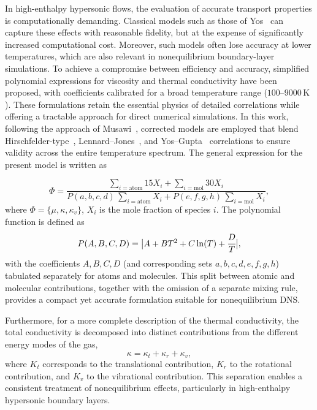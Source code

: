 In high-enthalpy hypersonic flows, the evaluation of accurate transport properties is computationally demanding. Classical models such as those of Yos~\citep{Yos1963} can capture these effects with reasonable fidelity, but at the expense of significantly increased computational cost. Moreover, such models often lose accuracy at lower temperatures, which are also relevant in nonequilibrium boundary-layer simulations. To achieve a compromise between efficiency and accuracy, simplified polynomial expressions for viscosity and thermal conductivity have been proposed, with coefficients calibrated for a broad temperature range ($100$--$9000\,\mathrm{K}$). These formulations retain the essential physics of detailed correlations while offering a tractable approach for direct numerical simulations. In this work, following the approach of Musawi~\citep{Musawi2025}, corrected models are employed that blend Hirschfelder-type~\citep{Hirschfelder1954}, Lennard--Jones~\citep{Matyushov1996}, and Yos--Gupta~\citep{Yos1963,Gupta1990} correlations to ensure validity across the entire temperature spectrum. The general expression for the present model is written as


%
\begin{equation}
\Phi =
\frac{\sum\limits_{i=\mathrm{atom}} 15X_i + \sum\limits_{i=\mathrm{mol}} 30X_i}
     {P(a,b,c,d)\,\sum\limits_{i=\mathrm{atom}} X_i + P(e,f,g,h)\,\sum\limits_{i=\mathrm{mol}} X_i},
\label{eq:present_model}
\end{equation}
%
where $\Phi = \{ \mu, \kappa, \kappa_v \}$, $X_i$ is the mole fraction of species $i$. The polynomial function is defined as
%
\begin{equation}
P(A,B,C,D) = \big| A + B T^2 + C \ln(T) + \cfrac{D}{T} \big|,
\label{eq:present_poly}
\end{equation}
%
with the coefficients $A,B,C,D$ (and corresponding sets $a,b,c,d,e,f,g,h$) tabulated separately for atoms and molecules. This split between atomic and molecular contributions, together with the omission of a separate mixing rule, provides a compact yet accurate formulation suitable for nonequilibrium DNS.

Furthermore, for a more complete description of the thermal conductivity, the total conductivity is decomposed into distinct contributions from the different energy modes of the gas,
%
\begin{equation}
\kappa = \kappa_t + \kappa_r + \kappa_v,
\label{eq:thermal_modes}
\end{equation}
%
where $K_t$ corresponds to the translational contribution, $K_r$ to the rotational contribution, and $K_v$ to the vibrational contribution. This separation enables a consistent treatment of nonequilibrium effects, particularly in high-enthalpy hypersonic boundary layers.


